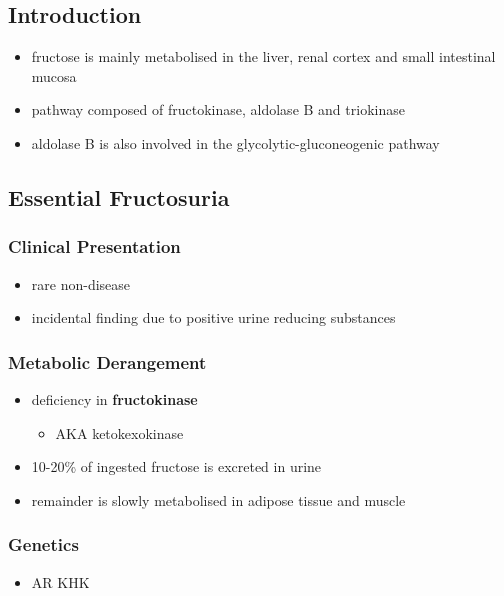\documentclass[12pt]{scrartcl}
\begin{document}
\subsection{Introduction}
\label{sec:orgc90df6e}
\begin{itemize}
\item fructose is mainly metabolised in the liver, renal cortex and small
intestinal mucosa
\item pathway composed of fructokinase, aldolase B and triokinase
\item aldolase B is also involved in the glycolytic-gluconeogenic pathway
\end{itemize}

\subsection{Essential Fructosuria}
\label{sec:org442523f}
\subsubsection{Clinical Presentation}
\label{sec:org3fe1052}
\begin{itemize}
\item rare non-disease
\item incidental finding due to positive urine reducing substances
\end{itemize}
\subsubsection{Metabolic Derangement}
\label{sec:orgd0fdbc5}
\begin{itemize}
\item deficiency in \textbf{fructokinase}
\begin{itemize}
\item AKA ketokexokinase
\end{itemize}
\end{itemize}


\begin{itemize}
\item 10-20\% of ingested fructose is excreted in urine
\item remainder is slowly metabolised in adipose tissue and muscle
\end{itemize}
\subsubsection{Genetics}
\label{sec:org3a3cac4}
\begin{itemize}
\item AR KHK
\end{itemize}
\end{document}
